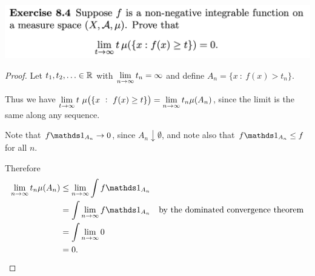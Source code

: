 

\begin{mdframed}
\includegraphics[width=400pt]{img/analysis--berkeley-202a-hw09-210c.png}
\end{mdframed}

\begin{proof}
  Let $t_1, t_2, \ldots \in \mathbb{R}$ with $\limn t_n = \infty$ and define $A_n = \{x ~:~ f(x) > t_n\}$.

  Thus we have $\lim_{t\to\infty} t ~ \mu\big(\{x ~:~ f(x) \geq t\}\big) = \limn t_n \mu(A_n)$, since the limit
  is the same along any sequence.

  Note that $f\ind_{A_n} \to 0$, since $A_n \downarrow \emptyset$, and note also that $f\ind_{A_n} \leq f$ for
  all $n$.

  Therefore
  \begin{align*}
    \limn t_n \mu(A_n)
    &\leq \limn \int f\ind_{A_n} \\
    &= \int \limn f\ind_{A_n}             &\text{by the dominated convergence theorem}\\
    &= \int \limn 0 \\
    &= 0.
  \end{align*}
\end{proof}

